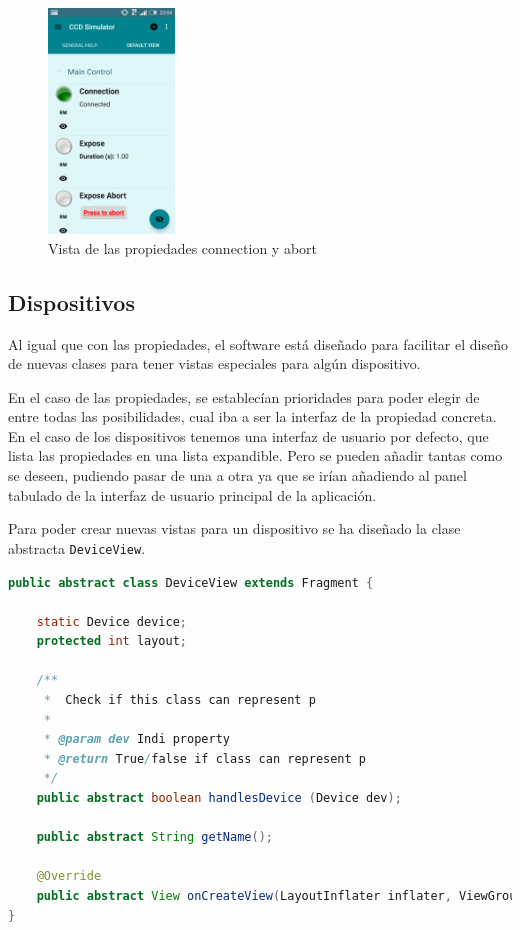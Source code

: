 \begin{figure}[!ht]
  \begin{center}
  \includegraphics[width=0.3\textwidth]{../images/captura10.png}
  \caption{Vista de las propiedades connection y abort}
  \label{fig:connect_abort}
  \end{center}
\end{figure}

\newpage
\subsection{Dispositivos}
Al igual que con las propiedades, el software está diseñado para facilitar el diseño de nuevas clases para tener vistas especiales para algún dispositivo.

\bigskip
En el caso de las propiedades, se establecían prioridades para poder elegir de entre todas las posibilidades, cual iba a ser la interfaz de la propiedad concreta. En el caso de los dispositivos tenemos una interfaz de usuario por defecto, que lista las propiedades en una lista expandible. Pero se pueden añadir tantas como se deseen, pudiendo pasar de una a otra ya que se irían añadiendo al panel tabulado de la interfaz de usuario principal de la aplicación.

Para poder crear nuevas vistas para un dispositivo se ha diseñado la clase abstracta \texttt{DeviceView}.

\begin{lstlisting}[language=Java,caption={Clase abstracta DeviceView},label={lst:device_view}]
public abstract class DeviceView extends Fragment {

    static Device device;
    protected int layout;

    /**
     *  Check if this class can represent p
     *
     * @param dev Indi property
     * @return True/false if class can represent p
     */
    public abstract boolean handlesDevice (Device dev);

    public abstract String getName();

    @Override
    public abstract View onCreateView(LayoutInflater inflater, ViewGroup container, Bundle savedInstanceState);
}

\end{lstlisting}


